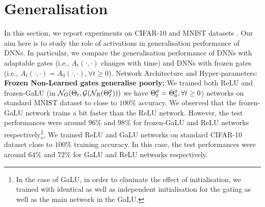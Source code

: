 \section{Generalisation}\label{sec:generalisation}
In this section, we report experiments on CIFAR-10 and MNIST  datasets . Our aim here is to study the role of activations in generalisation performance of DNNs. In particular, we compare the generalisation performance of DNNs with adaptable gates (i.e., $A_t(\cdot,\cdot)$ changes with time) and DNNs with frozen gates (i.e., $A_t(\cdot,\cdot)=A_0(\cdot,\cdot),\forall t\geq 0$).%
Network Architecture and Hyper-parameters:
\textbf{Frozen Non-Learned gates generalise poorly:} We trained both ReLU and frozen-GaLU (in $\mathcal{N}_G(\Theta_t,\mathcal{G}(\mathcal{N}_R({\Theta}^g_t)))$ we have ${\Theta}^g_t={\Theta}^g_0,\forall t\geq 0$) networks on standard MNIST dataset to close to $100\%$ accuracy. We observed that the frozen-GaLU network trains a bit faster than the ReLU network. However, the test performances were around $96\%$ and  $98\%$ for frozen-GaLU and ReLU networks respectively\footnote{In the case of GaLU, in order to eliminate the effect of initialisation, we trained with identical as well as independent initialisation for the gating as well as the main network in the GaLU. }. We trained ReLU and GaLU networks on standard CIFAR-10 dataset close to $100\%$ training accuracy. In this case, the test performances were around $64\%$ and $72\%$ for GaLU and ReLU networks respectively.\hfill\\

